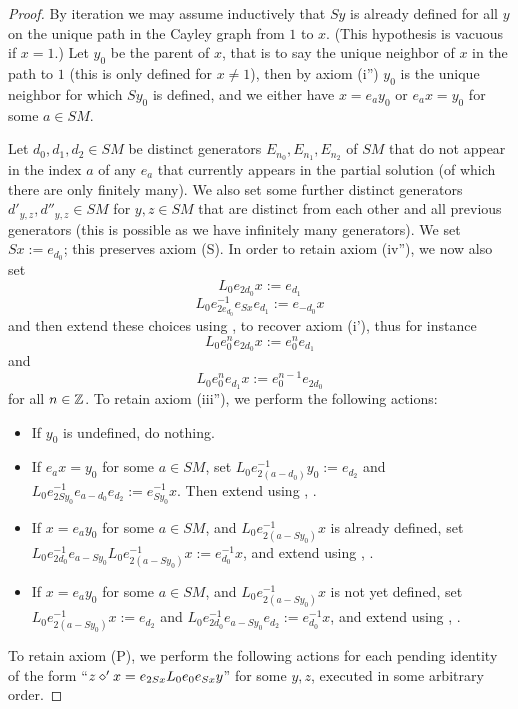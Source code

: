 \begin{proof} By iteration we may assume inductively that $Sy$ is already defined for all $y$ on the unique path in the Cayley graph from $1$ to $x$.  (This hypothesis is vacuous if $x=1$.)  Let $y_0$ be the parent of $x$, that is to say the unique neighbor of $x$ in the path to $1$ (this is only defined for $x \neq 1$), then by axiom (i'') $y_0$ is the unique neighbor for which $Sy_0$ is defined, and we either have $x = e_a y_0$ or $e_a x = y_0$ for some $a \in SM$.

Let $d_0, d_1, d_2 \in SM$ be distinct generators $E_{n_0}, E_{n_1}, E_{n_2}$ of $SM$ that do not appear in the index $a$ of any $e_a$ that currently appears in the partial solution (of which there are only finitely many).  We also set some further distinct generators $d'_{y,z}, d''_{y,z} \in SM$ for $y,z \in SM$ that are distinct from each other and all previous generators (this is possible as we have infinitely many generators).  We set $Sx := e_{d_0}$; this preserves axiom (S).  In order to retain axiom (iv''), we now also set
$$ L_0 e_{2d_0} x := e_{d_1}$$
$$ L_0 e_{2e_{d_0}}^{-1} e_{Sx} e_{d_1} := e_{-d_0} x$$
and then extend these choices using ,  to recover axiom (i'), thus for instance
$$ L_0 e_0^n e_{2d_0} x := e_0^n e_{d_1}$$
and
$$ L_0 e_0^n e_{d_1} x := e_0^{n-1} e_{2d_0}$$
for all $n \in \mathbb{Z}$.  To retain axiom (iii''), we perform the following actions:
\begin{itemize}
\item If $y_0$ is undefined, do nothing.
\item If $e_a x = y_0$ for some $a \in SM$, set $L_0 e_{2(a-d_0)}^{-1} y_0 := e_{d_2}$ and $L_0 e_{2Sy_0}^{-1} e_{a-d_0} e_{d_2} := e_{Sy_0}^{-1} x$.  Then extend using , .
\item If $x = e_a y_0$ for some $a \in SM$, and $L_0 e_{2(a-Sy_0)}^{-1} x$ is already defined, set $L_0 e_{2d_0}^{-1} e_{a-Sy_0} L_0 e_{2(a-Sy_0)}^{-1} x :=e_{d_0}^{-1} x$, and extend using , .
\item If $x = e_a y_0$ for some $a \in SM$, and $L_0 e_{2(a-Sy_0)}^{-1} x$ is not yet defined, set $L_0 e_{2(a-Sy_0)}^{-1} x := e_{d_2}$ and $L_0 e_{2d_0}^{-1} e_{a-Sy_0} e_{d_2} := e_{d_0}^{-1} x$, and extend using , .
\end{itemize}
To retain axiom (P), we perform the following actions for each pending identity of the form ``$z \diamond' x = e_{2Sx} L_0 e_0 e_{Sx} y$'' for some $y,z$, executed in some arbitrary order.

\end{proof}

